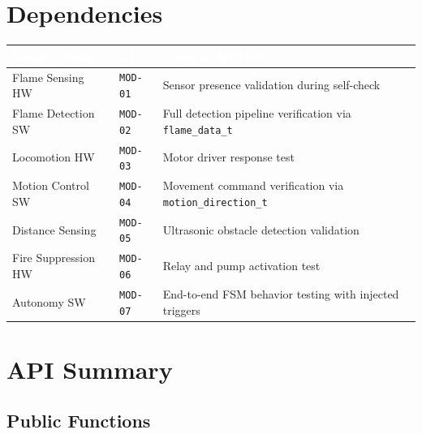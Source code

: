 \documentclass[a4paper,11pt]{article}
\newcommand{\theadtext}[1]{\textcolor{white}{\textbf{#1}}}
\begin{document}
\section{Dependencies}

\begin{tabular}{L{4.76cm} L{2.38cm} L{9.86cm}}
\toprule
{}
\theadtext{Module Name} & \theadtext{ID} & \theadtext{Usage in MOD-08} \\
\midrule
{}   Flame Sensing HW    & \texttt{MOD-01} & Sensor presence validation during self-check \\
 Flame Detection SW  & \texttt{MOD-02} & Full detection pipeline verification via \texttt{flame\_data\_t} \\
   Locomotion HW       & \texttt{MOD-03} & Motor driver response test \\
 Motion Control SW   & \texttt{MOD-04} & Movement command verification via \texttt{motion\_direction\_t} \\
   Distance Sensing    & \texttt{MOD-05} & Ultrasonic obstacle detection validation \\
 Fire Suppression HW & \texttt{MOD-06} & Relay and pump activation test \\
   Autonomy SW         & \texttt{MOD-07} & End-to-end FSM behavior testing with injected triggers \\
\bottomrule
\end{tabular}

\section{API Summary}

\subsection{Public Functions}
\end{document}
